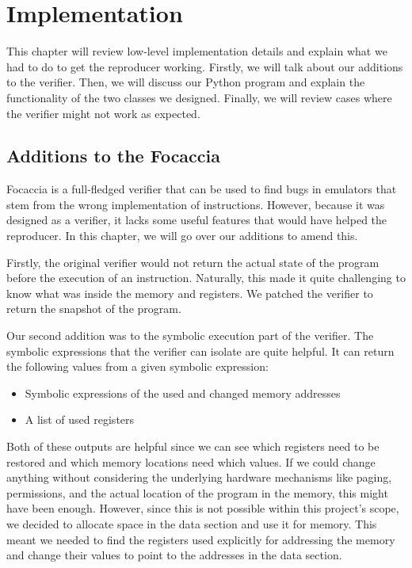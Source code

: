 
\chapter{Implementation}\label{chapter:implementation}
This chapter will review low-level implementation details and explain what we had to do to get the reproducer working.
Firstly, we will talk about our additions to the verifier.
Then, we will discuss our Python program and explain the functionality of the two classes we designed.
Finally, we will review cases where the verifier might not work as expected.

\section{Additions to the Focaccia}
Focaccia is a full-fledged verifier that can be used to find bugs in emulators that stem from the wrong implementation of instructions.
However, because it was designed as a verifier, it lacks some useful features that would have helped the reproducer.
In this chapter, we will go over our additions to amend this.

Firstly, the original verifier would not return the actual state of the program before the execution of an instruction.
Naturally, this made it quite challenging to know what was inside the memory and registers.
We patched the verifier to return the snapshot of the program.

Our second addition was to the symbolic execution part of the verifier.
The symbolic expressions that the verifier can isolate are quite helpful.
It can return the following values from a given symbolic expression:
\begin{itemize}
    \item Symbolic expressions of the used and changed memory addresses
    \item A list of used registers
\end{itemize}
Both of these outputs are helpful since we can see which registers need to be restored and which memory locations need which values.
If we could change anything without considering the underlying hardware mechanisms like paging, permissions, and the actual location of the program in the memory, this might have been enough.
However, since this is not possible within this project's scope, we decided to allocate space in the data section and use it for memory.
This meant we needed to find the registers used explicitly for addressing the memory and change their values to point to the addresses in the data section.

